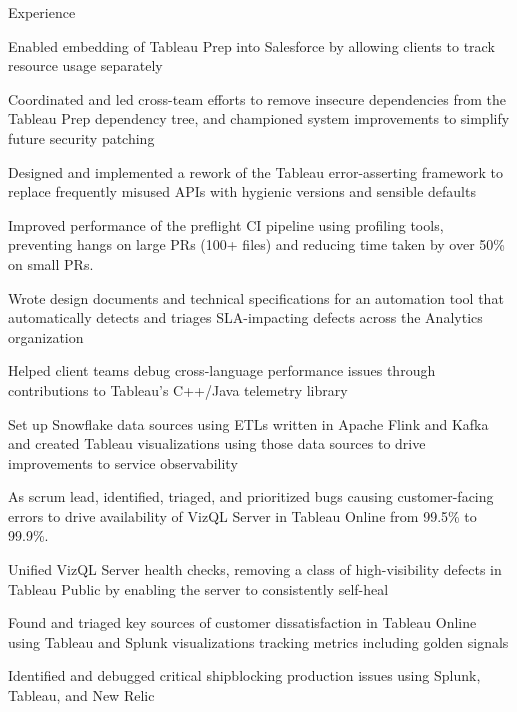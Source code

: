 \documentclass{cv}
\begin{document}

\begin{cvsection}{Experience}
  {
    \item Enabled embedding of Tableau Prep into Salesforce by allowing clients to track resource usage separately
    \item Coordinated and led cross-team efforts to remove insecure dependencies from the Tableau Prep dependency tree, and championed system improvements to simplify future security patching
    \item Designed and implemented a rework of the Tableau error-asserting framework to replace frequently misused APIs with hygienic versions and sensible defaults
    \item Improved performance of the preflight CI pipeline using profiling tools, preventing hangs on large PRs (100+ files) and reducing time taken by over 50\% on small PRs.
    \item Wrote design documents and technical specifications for an automation tool that automatically detects and triages SLA-impacting defects across the Analytics organization
    \item Helped client teams debug cross-language performance issues through contributions to Tableau's C++/Java telemetry library
    \item Set up Snowflake data sources using ETLs written in Apache Flink and Kafka and created Tableau visualizations using those data sources to drive improvements to service observability
    \item As scrum lead, identified, triaged, and prioritized bugs causing customer-facing errors to drive availability of VizQL Server in Tableau Online from 99.5\% to 99.9\%.
    \item Unified VizQL Server health checks, removing a class of high-visibility defects in Tableau Public by enabling the server to consistently self-heal
    \item Found and triaged key sources of customer dissatisfaction in Tableau Online using Tableau and Splunk visualizations tracking metrics including golden signals
    \item Identified and debugged critical shipblocking production issues using Splunk, Tableau, and New Relic
}
\end{cvsection}
\end{document}
